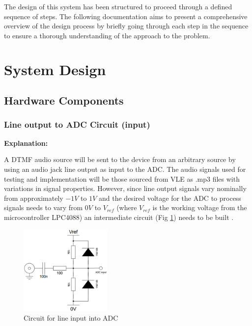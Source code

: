 \documentclass{cce2014-design}
\begin{document}
The design of this system has been structured to proceed through a defined sequence of steps.
The following documentation aims to present a comprehensive overview of the design process by briefly going through each step in the sequence to ensure a thorough understanding of the approach to the problem.

\section{System Design}
\subsection{Hardware Components}
\subsubsection{Line output to ADC Circuit (input)}
\textbf{Explanation:}

A DTMF audio source will be sent to the device from an arbitrary source by using an audio jack line output as input to the ADC.
The audio signals used for testing and implementation will be those sourced from VLE as .mp3 files with variations in signal properties.
However, since line output signals vary nominally from approximately $-1V$ to $1V$ and the desired voltage for the ADC to process signals needs to vary from $0V$ to $V_{ref}$ (where $V_{ref}$ is the working voltage from the microcontroller LPC4088) an intermediate circuit (Fig \ref*{fig:adccircuit}) needs to be built \cite{ADC_stackexchange}.

\begin{figure}[!h]
   \centering
   \includegraphics[width=0.4\textwidth]{adc_circuit.png}
   \caption{Circuit for line input into ADC}
   \label{fig:adccircuit}
\end{figure}
\end{document}

